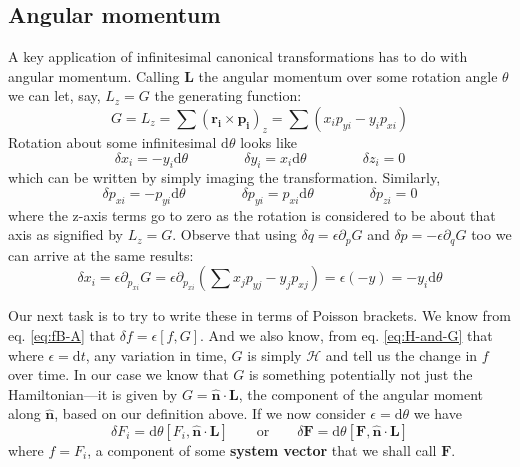 \documentclass[english,seminar,headertitle]{lecture}
\newcommand{\ham}{\mathscr{H}}
\newcommand{\diff}{\textrm{d}}
\begin{document}
\subsection{Angular momentum}

A key application of infinitesimal canonical transformations has to do with angular momentum. Calling $\mathbf{L}$ the angular momentum over some rotation angle $\theta$ we can let, say, $L_z = G$ the generating function:
\[
G = L_z = \sum \left( \mathbf{r_i \times p_i} \right)_z = \sum \left( x_i p_{yi} - y_ip_{xi} \right)
\]
Rotation about some infinitesimal $\diff \theta$ looks like
\[
\delta x_i = -y_i \diff \theta \qquad\qquad \delta y_i = x_i\diff \theta \qquad\qquad \delta z_i = 0
\]
which can be written by simply imaging the transformation. Similarly,
\[
\delta p_{xi} = -p_{yi}\diff\theta \qquad\qquad \delta p_{yi} = p_{xi}\diff\theta \qquad\qquad \delta p_{zi} = 0
\]
where the z-axis terms go to zero as the rotation is considered to be about that axis as signified by $L_z = G$. Observe that using $\delta q = \epsilon \partial_p G$ and $\delta p = - \epsilon \partial_q G$ too we can arrive at the same results:
\[
\delta x_i = \epsilon \partial_{p_{xi}} G = \epsilon \partial_{p_{xi}} \left( \sum x_jp_{yj} - y_jp_{xj} \right) = \epsilon (-y) = -y_i\diff \theta
\]

Our next task is to try to write these in terms of Poisson brackets. We know from eq. \eqref{eq:fB-A} that $\delta f = \epsilon [f,G]$. And we also know, from eq. \eqref{eq:H-and-G} that where $\epsilon = \diff t$, any variation in time, $G$ is simply $\ham$ and tell us the change in $f$ over time. In our case we know that $G$ is something potentially not just the Hamiltonian---it is given by $G = \mathbf{\hat{n}\cdot L}$, the component of the angular moment along $\mathbf{\hat{n}}$, based on our definition above. If we now consider $\epsilon = \diff\theta$ we have
\[
\delta F_i = \diff\theta \left[ F_i, \mathbf{\hat{n}\cdot L} \right] \qquad \textrm{or} \qquad \delta \mathbf{F} = \diff\theta [\mathbf{F}, \mathbf{\hat{n}\cdot L}]
\]
where $f = F_i$, a component of some \textbf{system vector} that we shall call $\mathbf{F}$.
\end{document}
